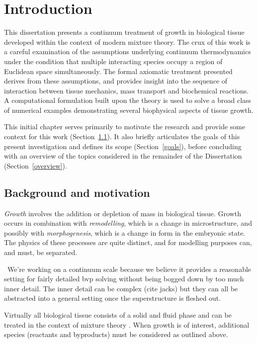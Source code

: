 \chapter{Introduction}
\label{introduction}

This dissertation presents a continuum treatment of growth in
biological tissue developed within the context of modern mixture
theory. The crux of this work is a careful examination of the
assumptions underlying continuum thermodynamics under the condition
that multiple interacting species occupy a region of Euclidean space
simultaneously. The formal axiomatic treatment presented derives from
these assumptions, and provides insight into the sequence of
interaction between tissue mechanics, mass transport and biochemical
reactions. A computational formulation built upon the theory is used
to solve a broad class of numerical examples demonstrating several
biophysical aspects of tissue growth.

This initial chapter serves primarily to motivate the research and
provide some context for this work (Section~\ref{background}). It also
briefly articulates the goals of this present investigation and
defines its scope (Section~\ref{goals}), before concluding with an
overview of the topics considered in the remainder of the Dissertation
(Section~\ref{overview}).

\section{Background and motivation}
\label{background}

\emph{Growth} involves the addition or depletion of mass in biological
tissue. Growth occurs in combination with
\emph{remodelling}, which is a change in microstructure, and possibly
with \emph{morphogenesis}, which is a change in form in the embryonic
state. The physics of these processes are quite distinct, and for
modelling purposes can, and must, be separated.

\textbullet\ We're working on a continuum scale because we believe it provides a
reasonable setting for fairly detailed bvp solving without being
bogged down by too much inner detail. The inner detail can be complex
(cite jacks) but they can all be abstracted into a general setting
once the superstructure is fleshed out.

Virtually all biological tissue consists of a solid and fluid
phase and can be treated in the context of mixture theory
\citep{TruesdellToupin:60,TruesdellNoll:65,BedfordDrumheller:1983}.
When growth is of interest, additional species (reactants and
byproducts) must be considered as outlined above.

